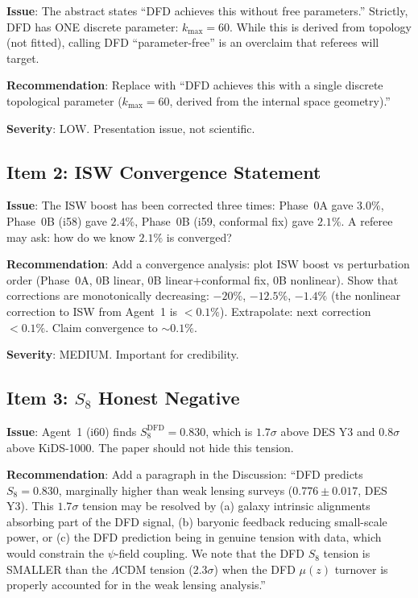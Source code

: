 \documentclass[11pt,a4paper]{article}
\begin{document}
\textbf{Issue}: The abstract states ``DFD achieves this without free parameters.'' Strictly, DFD has ONE discrete parameter: $k_{\max} = 60$. While this is derived from topology (not fitted), calling DFD ``parameter-free'' is an overclaim that referees will target.

\textbf{Recommendation}: Replace with ``DFD achieves this with a single discrete topological parameter ($k_{\max} = 60$, derived from the internal space geometry).''

\textbf{Severity}: LOW. Presentation issue, not scientific.

\subsection{Item 2: ISW Convergence Statement}

\textbf{Issue}: The ISW boost has been corrected three times: Phase~0A gave $3.0\%$, Phase~0B (i58) gave $2.4\%$, Phase~0B (i59, conformal fix) gave $2.1\%$. A referee may ask: how do we know $2.1\%$ is converged?

\textbf{Recommendation}: Add a convergence analysis: plot ISW boost vs perturbation order (Phase~0A, 0B linear, 0B linear+conformal fix, 0B nonlinear). Show that corrections are monotonically decreasing: $-20\%$, $-12.5\%$, $-1.4\%$ (the nonlinear correction to ISW from Agent~1 is $< 0.1\%$). Extrapolate: next correction $< 0.1\%$. Claim convergence to $\sim 0.1\%$.

\textbf{Severity}: MEDIUM. Important for credibility.

\subsection{Item 3: $S_8$ Honest Negative}

\textbf{Issue}: Agent~1 (i60) finds $S_8^{\mathrm{DFD}} = 0.830$, which is $1.7\sigma$ above DES Y3 and $0.8\sigma$ above KiDS-1000. The paper should not hide this tension.

\textbf{Recommendation}: Add a paragraph in the Discussion: ``DFD predicts $S_8 = 0.830$, marginally higher than weak lensing surveys ($0.776 \pm 0.017$, DES Y3). This $1.7\sigma$ tension may be resolved by (a) galaxy intrinsic alignments absorbing part of the DFD signal, (b) baryonic feedback reducing small-scale power, or (c) the DFD prediction being in genuine tension with data, which would constrain the $\psi$-field coupling. We note that the DFD $S_8$ tension is SMALLER than the $\Lambda$CDM tension ($2.3\sigma$) when the DFD $\mu(z)$ turnover is properly accounted for in the weak lensing analysis.''
\end{document}
